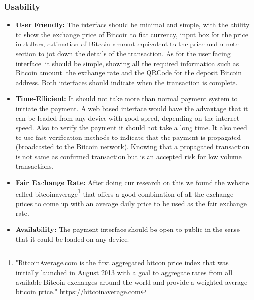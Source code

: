 \subsubsection{Usability} 
\begin{itemize}

\item \textbf{User Friendly: } The interface should be minimal and simple, with the ability to show the exchange price of Bitcoin to fiat currency, input box for the price in dollars, estimation of Bitcoin amount equivalent to the price and a note section to jot down the details of the transaction.
As for the user facing interface, it should be simple, showing all the required information such as Bitcoin amount, the exchange rate and the QRCode for the deposit Bitcoin address. Both interfaces should indicate when the transaction is complete.

\item \textbf{Time-Efficient: } It should not take more than normal payment system to initiate the payment. A web based interface would have the advantage that it can be loaded from any device with good speed, depending on the internet speed. Also to verify the payment it should not take a long time. It also need to use fast verification methods to indicate that the payment is propagated (broadcasted to the Bitcoin network). Knowing that a propagated transaction is not same as confirmed transaction but is an accepted risk for low volume transactions.

\item \textbf{Fair Exchange Rate: } After doing our research on this we found the website called bitcoinaverage\footnote{"BitcoinAverage.com is the first aggregated bitcon price index that was initially launched in August 2013 with a goal to aggregate rates from all available Bitcoin exchanges around the world and provide a weighted average bitcoin price." \url{https://bitcoinaverage.com}} that offers a good combination of all the exchange prices to come up with an average daily price to be used as the fair exchange rate.

\item \textbf{Availability: } The payment interface should be open to public in the sense that it could be loaded on any device. 

\end{itemize}
